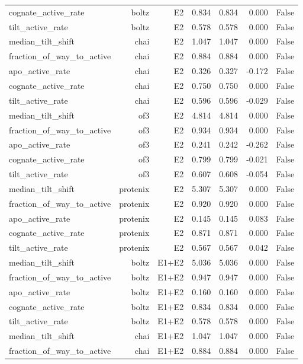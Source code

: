 \begin{table}[htbp]
\begin{tabular}{lrrrrrr}
cognate\_active\_rate & boltz & E2 & 0.834 & 0.834 & 0.000 & False \\
tilt\_active\_rate & boltz & E2 & 0.578 & 0.578 & 0.000 & False \\
median\_tilt\_shift & chai & E2 & 1.047 & 1.047 & 0.000 & False \\
fraction\_of\_way\_to\_active & chai & E2 & 0.884 & 0.884 & 0.000 & False \\
apo\_active\_rate & chai & E2 & 0.326 & 0.327 & -0.172 & False \\
cognate\_active\_rate & chai & E2 & 0.750 & 0.750 & 0.000 & False \\
tilt\_active\_rate & chai & E2 & 0.596 & 0.596 & -0.029 & False \\
median\_tilt\_shift & of3 & E2 & 4.814 & 4.814 & 0.000 & False \\
fraction\_of\_way\_to\_active & of3 & E2 & 0.934 & 0.934 & 0.000 & False \\
apo\_active\_rate & of3 & E2 & 0.241 & 0.242 & -0.262 & False \\
cognate\_active\_rate & of3 & E2 & 0.799 & 0.799 & -0.021 & False \\
tilt\_active\_rate & of3 & E2 & 0.607 & 0.608 & -0.054 & False \\
median\_tilt\_shift & protenix & E2 & 5.307 & 5.307 & 0.000 & False \\
fraction\_of\_way\_to\_active & protenix & E2 & 0.920 & 0.920 & 0.000 & False \\
apo\_active\_rate & protenix & E2 & 0.145 & 0.145 & 0.083 & False \\
cognate\_active\_rate & protenix & E2 & 0.871 & 0.871 & 0.000 & False \\
tilt\_active\_rate & protenix & E2 & 0.567 & 0.567 & 0.042 & False \\
median\_tilt\_shift & boltz & E1+E2 & 5.036 & 5.036 & 0.000 & False \\
fraction\_of\_way\_to\_active & boltz & E1+E2 & 0.947 & 0.947 & 0.000 & False \\
apo\_active\_rate & boltz & E1+E2 & 0.160 & 0.160 & 0.000 & False \\
cognate\_active\_rate & boltz & E1+E2 & 0.834 & 0.834 & 0.000 & False \\
tilt\_active\_rate & boltz & E1+E2 & 0.578 & 0.578 & 0.000 & False \\
median\_tilt\_shift & chai & E1+E2 & 1.047 & 1.047 & 0.000 & False \\
fraction\_of\_way\_to\_active & chai & E1+E2 & 0.884 & 0.884 & 0.000 & False \\

\end{tabular}
\end{table}
